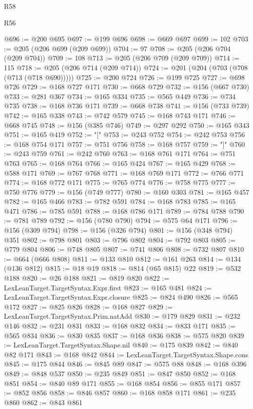 \begin{lexlean}{R58}
\begin{lexlean}{R56}
\begin{coremodule}
{{{{{{{{{{{{{{{{{{{{{{{{{{{{{{{{{{{{{{{{{{{{{{{{{{{{{{{{{{{{{{{{{{{{{{{{{{{{{{{{{{{{{{{{{{{{{{{{{{{{{{{{{{{{{{{{{{{{{{{{{{{{{{{{{{{{{{{{{{{{{{{{{{{{{{{{{{{{{{{{{{{{{{{{{{{{{{{{{{{{{{{{{{{{{{{{{{{{{{{{{{{{{{{{{{{@696 := @200 @695
@697 := @199 @696
@698 := @669 @697
@699 := 102
@703 := @205 (@206 @699 (@209 @699))
@704 := 97
@708 := @205 (@206 @704 (@209 @704))
@709 := 108
@713 := @205 (@206 @709 (@209 @709))
@714 := 115
@718 := @205 (@206 @714 (@209 @714))
@724 := @201 (@204 (@703 (@708 (@713 (@718 @690)))))
@725 := @200 @724
@726 := @199 @725
@727 := @698 @726
@729 := @168 @727 @171
@730 := @668 @729
@732 := @156 (@667 @730)
@733 := @281 @367
@734 := @165 @334
@735 := @565 @449
@736 := @734 @735
@738 := @168 @736 @171
@739 := @668 @738
@741 := @156 (@733 @739)
@742 := @165 @338
@743 := @742 @579
@745 := @168 @743 @171
@746 := @668 @745
@748 := @156 (@385 @746)
@749 := @297 @292
@750 := @165 @343
@751 := @165 @419
@752 := "["
@753 := @243 @752
@754 := @242 @753
@756 := @168 @754 @171
@757 := @751 @756
@758 := @168 @757
@759 := "]"
@760 := @243 @759
@761 := @242 @760
@763 := @168 @761 @171
@764 := @751 @763
@765 := @168 @764
@766 := @165 @424
@767 := @165 @429
@768 := @588 @171
@769 := @767 @768
@771 := @168 @769 @171
@772 := @766 @771
@774 := @168 @772 @171
@775 := @765 @774
@776 := @758 @775
@777 := @750 @776
@779 := @156 (@749 @777)
@780 := @160 @303
@781 := @165 @457
@782 := @165 @466
@783 := @782 @591
@784 := @168 @783
@785 := @165 @471
@786 := @785 @591
@788 := @168 @786 @171
@789 := @784 @788
@790 := @781 @789
@792 := @156 (@780 @790)
@794 := @575 @64 @171
@796 := @156 (@309 @794)
@798 := @156 (@326 @794)
@801 := @156 (@348 @794) @351
@802 := @798 @801
@803 := @796 @802
@804 := @792 @803
@805 := @779 @804
@806 := @748 @805
@807 := @741 @806
@808 := @732 @807
@810 := @664 (@666 @808)
@811 := @133 @810
@812 := @161 @263
@814 := @134 (@136 @812)
@815 := @18 @19
@818 := @814 (@65 @815) @22
@819 := @532 @188
@820 := @26 @188
@821 := @819 @820
@822 := LexLeanTarget.TargetSyntax.Expr.first
@823 := @165 @481
@824 := LexLeanTarget.TargetSyntax.Expr.closure
@825 := @824 @490
@826 := @565 @172
@827 := @825 @826
@828 := @168 @827
@829 := LexLeanTarget.TargetSyntax.Prim.natAdd
@830 := @179 @829
@831 := @232 @146
@832 := @231 @831
@833 := @168 @832
@834 := @833 @171
@835 := @565 @834
@836 := @830 @835
@837 := @168 @836
@838 := @575 @820
@839 := LexLeanTarget.TargetSyntax.Shape.nil
@840 := @175 @839
@842 := @840 @82 @171
@843 := @168 @842
@844 := LexLeanTarget.TargetSyntax.Shape.cons
@845 := @175 @844
@846 := @845 @89
@847 := @575 @88
@848 := @168 @396
@849 := @848 @537
@850 := @235 @849
@851 := @847 @850
@852 := @168 @851
@854 := @840 @89 @171
@855 := @168 @854
@856 := @855 @171
@857 := @852 @856
@858 := @846 @857
@860 := @168 @858 @171
@861 := @235 @860
@862 := @843 @861
}}}}}}}}}}}}}}}}}}}}}}}}}}}}}}}}}}}}}}}}}}}}}}}}}}}}}}}}}}}}}}}}}}}}}}}}}}}}}}}}}}}}}}}}}}}}}}}}}}}}}}}}}}}}}}}}}}}}}}}}}}}}}}}}}}}}}}}}}}}}}}}}}}}}}}}}}}}}}}}}}}}}}}}}}}}}}}}}}}}}}}}}}}}}}}}}}}}}}}}}}}}}}}}}}}}
\end{coremodule}
\end{lexlean}
\end{lexlean}
